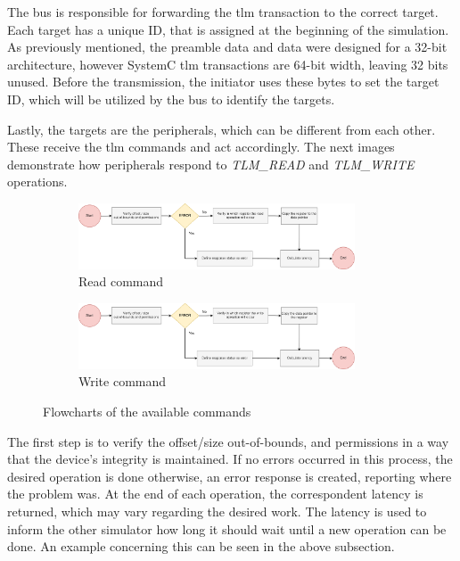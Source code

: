 The bus is responsible for forwarding the \gls{tlm} transaction to the correct target. Each target has a unique ID, that is assigned 
at the beginning of the simulation. As previously mentioned, the preamble data and data were designed for a 32-bit architecture, however 
SystemC \gls{tlm} transactions are 64-bit width, leaving 32 bits unused. Before the transmission, the initiator uses these bytes to set the 
target ID, which will be utilized by the bus to identify the targets.

Lastly, the targets are the peripherals, which can be different from each other. These receive the 
\gls{tlm} commands and act accordingly. The next images demonstrate how peripherals respond to \textit{TLM\_READ} and \textit{TLM\_WRITE} 
\space operations. 

\begin{figure}[H]
	\centering
	\begin{subfigure}{\textwidth}
		\centering
		\includegraphics[width=0.9\textwidth]{Images/CoSimReadOperation.png}
 		\caption[1\textwidth]{Read command}
	\end{subfigure}
	\begin{subfigure}{\textwidth}
		\centering
		\includegraphics[width=0.9\textwidth]{Images/CoSimWriteOperation.png}
		\caption[1\textwidth]{Write command}
	\end{subfigure}
		
	\caption{Flowcharts of the available commands}
\end{figure}

The first step is to verify the offset/size out-of-bounds, and permissions in a way that the device's integrity is maintained. If no errors occurred 
in this process, the desired operation is done otherwise, an error response is created, reporting where the problem was. 
At the end of each operation, the correspondent latency is returned, which may vary regarding the desired work. The latency is used to inform the 
other simulator how long it should wait until a new operation can be done. An example concerning this can be seen in the above subsection.  

